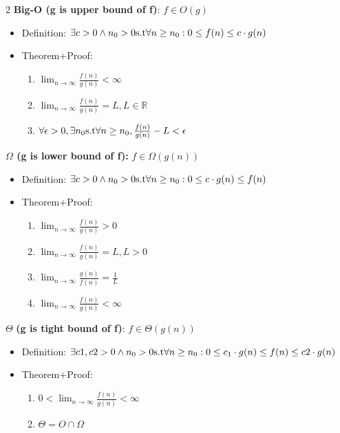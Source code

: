 \documentclass[10pt,landscape]{article}
\begin{document}
\begin{multicols*}{2}
\textbf{Big-O (g is upper bound of f)}: $f \in O(g)$
\begin{itemize}
    \item Definition: $\exists c > 0 \land n_0 > 0 \space \text{s.t} \space \forall n \geq n_0: 0 \leq f(n) \leq c \cdot g(n)$
    \item Theorem+Proof: 
    \begin{enumerate}
        \item $\lim_{n\rightarrow \infty} \frac{f(n)}{g(n)} < \infty$
        \item $\lim_{n\rightarrow \infty} \frac{f(n)}{g(n)} = L, L \in \mathbb{R}$
        \item $\forall \epsilon > 0, \exists n_0 \space \text{s.t} \space \forall n \geq n_0, \frac{f(n)}{g(n)} - L < \epsilon$
    \end{enumerate}
\end{itemize}
\vspace{8pt}
\textbf{$\Omega$ (g is lower bound of f):} $f \in \Omega (g(n))$
\begin{itemize}
    \item Definition: $\exists c > 0 \land n_0 > 0 \space \text{s.t} \space \forall n \geq n_0: 0 \leq c \cdot g(n) \leq f(n)$ 
    \item Theorem+Proof:
    \begin{enumerate}
        \item $\lim_{n\rightarrow \infty} \frac{f(n)}{g(n)} > 0$
        \item $\lim_{n\rightarrow \infty} \frac{f(n)}{g(n)} = L, L > 0$
        \item $\lim_{n\rightarrow \infty} \frac{g(n)}{f(n)} = \frac{1}{L}$
        \item $\lim_{n\rightarrow \infty} \frac{f(n)}{g(n)} < \infty$
    \end{enumerate}
\end{itemize}
\vspace{8pt}
$\Theta$ \textbf{(g is tight bound of f)}: $f \in \Theta (g(n))$
\begin{itemize}
    \item Definition: $\exists c1, c2 > 0 \land n_0 > 0 \space \text{s.t} \space \forall n \geq n_0: 0 \leq c_1 \cdot g(n) \leq f(n) \leq c2 \cdot g(n)$
    \item Theorem+Proof:
    \begin{enumerate}
        \item $0 < \lim_{n\rightarrow \infty} \frac{f(n)}{g(n)} < \infty$
        \item $\Theta = O \cap \Omega$

\end{enumerate}
\end{itemize}
\end{multicols*}
\end{document}

